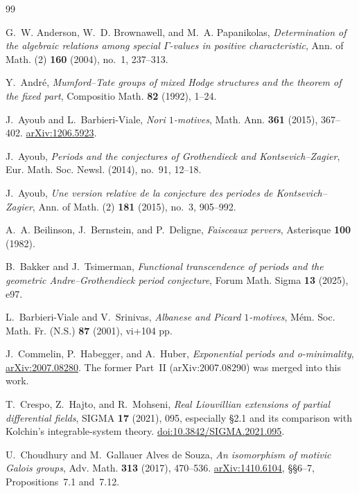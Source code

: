 \documentclass[11pt]{article}
\numberwithin{equation}{section}
\theoremstyle{definition}
\theoremstyle{remark}
\begin{document}
\small
\begin{thebibliography}{99}

G.~W. Anderson, W.~D. Brownawell, and M.~A. Papanikolas,
\emph{Determination of the algebraic relations among special $\Gamma$-values in positive characteristic},
Ann. of Math. (2) \textbf{160} (2004), no.~1, 237--313.

Y.~Andr\'e, \emph{Mumford--Tate groups of mixed Hodge structures and the
theorem of the fixed part}, Compositio Math. \textbf{82} (1992), 1--24.

J.~Ayoub and L.~Barbieri-Viale, \emph{Nori $1$-motives}, Math. Ann.
\textbf{361} (2015), 367--402. \href{https://arxiv.org/abs/1206.5923}{arXiv:1206.5923}.

J.~Ayoub,
\emph{Periods and the conjectures of Grothendieck and Kontsevich--Zagier},
Eur. Math. Soc. Newsl. (2014), no.~91, 12--18.

J.~Ayoub,
\emph{Une version relative de la conjecture des periodes de Kontsevich--Zagier},
Ann. of Math. (2) \textbf{181} (2015), no.~3, 905--992.

A.~A. Beilinson, J.~Bernstein, and P.~Deligne,
\emph{Faisceaux pervers},
Asterisque \textbf{100} (1982).

B.~Bakker and J.~Tsimerman,
\emph{Functional transcendence of periods and the geometric Andre--Grothendieck period conjecture},
Forum Math. Sigma \textbf{13} (2025), e97.

L.~Barbieri-Viale and V.~Srinivas, \emph{Albanese and Picard $1$-motives},
M\'em. Soc. Math. Fr. (N.S.) \textbf{87} (2001), vi+104 pp.

J.~Commelin, P.~Habegger, and A.~Huber,
\emph{Exponential periods and o-minimality},
\href{https://arxiv.org/abs/2007.08280}{arXiv:2007.08280}.
The former Part~II (arXiv:2007.08290) was merged into this work.

T.~Crespo, Z.~Hajto, and R.~Mohseni, \emph{Real Liouvillian extensions of
partial differential fields}, SIGMA \textbf{17} (2021), 095, especially
\S2.1 and its comparison with Kolchin's integrable-system theory.
\href{https://doi.org/10.3842/SIGMA.2021.095}{doi:10.3842/SIGMA.2021.095}.

U.~Choudhury and M.~Gallauer Alves de Souza,
\emph{An isomorphism of motivic Galois groups},
Adv. Math. \textbf{313} (2017), 470--536.
\href{https://arxiv.org/abs/1410.6104}{arXiv:1410.6104},
\S\S6--7, Propositions~7.1 and~7.12.


\end{thebibliography}
\end{document}
